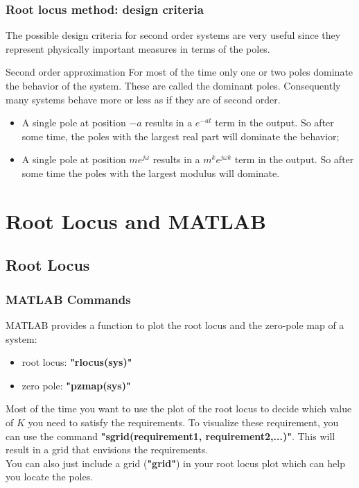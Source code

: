 \begin{frame}
\frametitle{Root locus method: design criteria}
	The possible design criteria for second order systems are very useful since they represent physically important measures in terms of the poles.\\
	\begin{alertblock}{Second order approximation}
		For most of the time only one or two poles dominate the behavior of the system. These are called the dominant poles. Consequently many systems behave more or less as if they are of second order. 
	\end{alertblock}
	\begin{itemize}
		\item A single pole at position $-a$ results in a $e^{-at}$ term in the output. So after some time, the poles with the largest real part will dominate the behavior;
		\item A single pole at position $me^{j\omega}$ results in a $m^ke^{j\omega k}$ term in the output. So after some time the poles with the largest modulus will dominate. 
	\end{itemize}
\end{frame}
	
\section{Root Locus and MATLAB}

\subsection{Root Locus}

\begin{frame}
\frametitle{MATLAB Commands}
	MATLAB provides a function to plot the root locus and the zero-pole map of a system:
	\begin{itemize}
		\item root locus: \textbf{"rlocus(sys)"}
		\item zero pole: \textbf{"pzmap(sys)"}
	\end{itemize} 
	\vspace{1em}
	Most of the time you want to use the plot of the root locus to decide which value of $K$ you need to satisfy the requirements. To visualize these requirement, you can use the command \textbf{"sgrid(requirement1, requirement2,...)"}. This will result in a grid that envisions the requirements.\\
	\vspace{1em}
	You can also just include a grid (\textbf{"grid"}) in your root locus plot which can help you locate the poles.
\end{frame}


